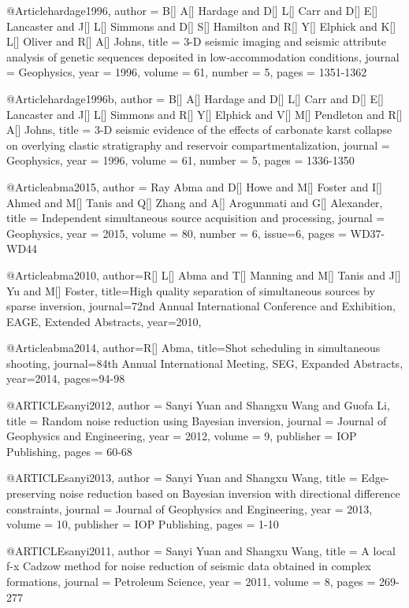   
  
@Article{hardage1996,
  author = 	 {B[] A[] Hardage and D[] L[] Carr and D[] E[] Lancaster and J[] L[] Simmons and D[] S[] Hamilton and R[] Y[] Elphick and K[] L[] Oliver and R[] A[] Johns},
  title = 	 {3-D seismic imaging and seismic attribute analysis of genetic sequences deposited in low‐accommodation conditions},
  journal = 	 {Geophysics},
  year = 	 1996,
  volume = 	 61,
  number = 	 5,
  pages = 	 {1351-1362}}

@Article{hardage1996b,
  author = 	 {B[] A[] Hardage and D[] L[] Carr and D[] E[] Lancaster and J[] L[] Simmons and R[] Y[] Elphick and V[] M[] Pendleton and R[] A[] Johns},
  title = 	 {3-D seismic evidence of the effects of carbonate karst collapse on overlying clastic stratigraphy and reservoir compartmentalization},
  journal = 	 {Geophysics},
  year = 	 1996,
  volume = 	 61,
  number = 	 5,
  pages = 	 {1336-1350}}
 
@Article{abma2015,
  author = 	 {Ray Abma and D[] Howe and M[] Foster and I[] Ahmed and M[] Tanis and Q[] Zhang and A[] Arogunmati and G[] Alexander},
  title = 	 {Independent simultaneous source acquisition and processing},
  journal = 	 {Geophysics},
  year = 	 2015,
  volume = 	 80,
  number = 	 6,
  issue=6,
  pages = 	 {WD37-WD44}}
  
    
@Article{abma2010,
  author={R[] L[] Abma and T[] Manning and M[] Tanis and J[] Yu and M[] Foster},
  title={High quality separation of simultaneous sources by sparse inversion},
  journal={72nd Annual International Conference and Exhibition, EAGE, Extended Abstracts},
  year=2010,
}

@Article{abma2014,
  author={R[] Abma},
  title={Shot scheduling in simultaneous shooting},
  journal={84th Annual International Meeting, SEG, Expanded Abstracts},
  year=2014,
  pages={94-98}
}

@ARTICLE{sanyi2012,
  author = {Sanyi Yuan and Shangxu Wang and Guofa Li},
  title = {Random noise reduction using Bayesian inversion},
  journal = {Journal of Geophysics and Engineering},
  year = {2012},
  volume = {9},
  publisher = {IOP Publishing},
  pages = {60-68}
}

@ARTICLE{sanyi2013,
  author = {Sanyi Yuan and Shangxu Wang},
  title = {Edge-preserving noise reduction based on Bayesian inversion with directional difference constraints},
  journal = {Journal of Geophysics and Engineering},
  year = {2013},
  volume = {10},
  publisher = {IOP Publishing},
  pages = {1-10}
}

@ARTICLE{sanyi2011,
  author = {Sanyi Yuan and Shangxu Wang},
  title = {A local f-x Cadzow method for noise reduction of seismic data obtained in complex formations},
  journal = {Petroleum Science},
  year = {2011},
  volume = {8},
  pages = {269-277}
}

